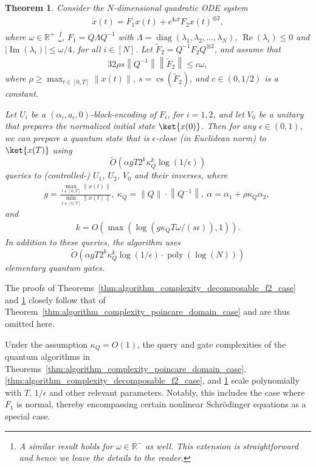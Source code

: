 \documentclass[superscriptaddress,onecolumn,nofootinbib,longbibliography,a4paper,accepted=2026-09-29]{quantumarticle}
\theoremstyle{plain}
\newtheorem{thm}{Theorem}
\theoremstyle{definition}
\numberwithin{thm}{section}
\numberwithin{assumption}{section}
\numberwithin{lemma}{section}
\numberwithin{prop}{section}
\numberwithin{cor}{section}
\numberwithin{definition}{section}
\numberwithin{rmk}{section}
\numberwithin{equation}{section}
\newcommand{\abs}[1]      {\left| #1 \right|}
\newcommand{\norm}[1]     {\left\| #1 \right\|}
\newcommand{\ot}{\otimes}
\newcommand{\R}{\mathbb{R}}
\newcommand{\lrb}[1]{\left ( #1 \right )}
\renewcommand{\i}{\ensuremath{\mathbf{i}}}
\newcommand{\realpart}[1]{\operatorname{Re}\lrb{#1}}
\newcommand{\imaginarypart}[1]{\operatorname{Im}\lrb{#1}}
\newcommand{\mypoly}[1]{\operatorname{poly} \lrb{#1}}
\newcommand{\mylog}[1]{\operatorname{log} \lrb{#1}}
\newcommand{\myO}[1]{O\lrb{#1}}
\newcommand{\mytO}[1]{\tilde{O}\lrb{#1}}
\newcommand{\diag}[1]{\operatorname{diag}\lrb{#1}}
\begin{document}
\begin{thm}
Consider the $N$-dimensional quadratic ODE system
\begin{align}
    \dot{x}(t) = F_1 x(t) + e^{\i \omega t}F_2 x(t)^{\ot 2},
\end{align}
where $\omega \in \R^+$ \footnote{A similar result holds for $\omega \in \R^-$ as well. This extension is straightforward and hence we leave the details to the reader.}, 
$F_1=Q\Lambda Q^{-1}$ with $\Lambda=\diag{\lambda_1, \lambda_2, \dots, \lambda_N}$, $\realpart{\lambda_i} \le 0$ and $\abs{\imaginarypart{\lambda_i}} \le \omega/4$, for all $i \in [N]$. Let $\tilde{F}_2=Q^{-1}F_2Q^{\otimes 2}$, and assume that
\begin{align}
32\rho s \norm{Q^{-1}} \norm{\tilde{F}_2} \le c\omega,    
\end{align}
where $\rho \ge \max_{t \in [0, T]} \norm{x(t)}$, $s=\operatorname{cs}(\tilde{F}_2)$, and 
$c \in (0,1/2)$ is a constant.

Let $U_i$ be a $(\alpha_i, a_i, 0)$-block-encoding of $F_i$, for $i=1,2$, and let $V_0$ be a unitary that prepares the normalized initial state $\ket{x(0)}$. Then for any $\epsilon \in (0, 1)$, we can prepare a quantum state that is $\epsilon$-close (in Euclidean norm) to $\ket{x(T)}$ using 
$$\mytO{\alpha g T  2^k \kappa_Q^k\mylog{1/\epsilon}}$$
queries to (controlled-) $U_1$, $U_2$, $V_0$ and their inverses, where 
\begin{align}
g=\frac{\max_{t \in [0, T]} {\norm{x(t)}}}{\min_{t \in [0, T]} {\norm{x(t)}}},~
\kappa_Q=\norm{Q}\cdot \norm{Q^{-1}},~
\alpha=\alpha_1+{\rho\kappa_Q\alpha_2},~ 
\end{align} 
and
\begin{align}
k=\myO{\max(\mylog{ g  \kappa_Q T\omega/(s\epsilon)}, 1)}.    
\end{align}
In addition to these queries, the algorithm uses
$$\mytO{\alpha g T 2^k \kappa_Q^k \mylog{1/\epsilon}\cdot \mypoly{\mylog{N}}}$$
elementary quantum gates.
\label{thm:algorithm_complexity_time_dependent_f2_case}
\end{thm}

The proofs of Theorems~\ref{thm:algorithm_complexity_decomposable_f2_case} and \ref{thm:algorithm_complexity_time_dependent_f2_case} closely follow that of Theorem~\ref{thm:algorithm_complexity_poincare_domain_case} and are thus omitted here.

Under the assumption $\kappa_Q = \myO{1}$, the query and gate complexities of the quantum algorithms in Theorems~\ref{thm:algorithm_complexity_poincare_domain_case}, \ref{thm:algorithm_complexity_decomposable_f2_case}, and \ref{thm:algorithm_complexity_time_dependent_f2_case} scale polynomially with $T$, $1/\epsilon$ and other relevant parameters. Notably, this includes the case where $F_1$ is normal, thereby encompassing certain nonlinear Schr\"{o}dinger equations as a special case. 
\end{document}
